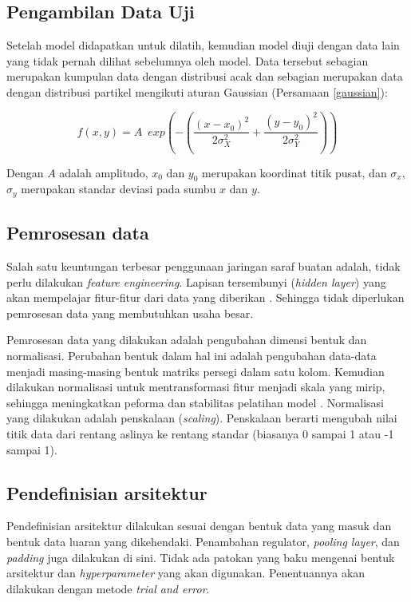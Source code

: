 \subsection{Pengambilan Data Uji}
Setelah model didapatkan untuk dilatih, kemudian model diuji dengan data lain
yang tidak pernah dilihat sebelumnya oleh model. Data tersebut sebagian merupakan
kumpulan data dengan distribusi acak dan sebagian merupakan data dengan distribusi
partikel mengikuti aturan Gaussian (Persamaan \eqref{gaussian}):

\begin{equation}
  \label{gaussian}f(x,y) = A \enspace exp \left(-\left(\frac{(x-x_{0})^{2}}{2
  \sigma^{2}_{X}}+ \frac{(y-y_{0})^{2}}{2 \sigma^{2}_{Y}}\right)\right)
\end{equation}

Dengan $A$ adalah amplitudo, $x_{0}$ dan $y_{0}$ merupakan koordinat titik pusat,
dan $\sigma_{x}$, $\sigma_{y}$ merupakan standar deviasi pada sumbu $x$ dan $y$.

\subsection{Pemrosesan data}
Salah satu keuntungan terbesar penggunaan jaringan saraf buatan adalah, tidak perlu
dilakukan \emph{feature engineering}. Lapisan tersembunyi (\emph{hidden layer})
yang akan mempelajar fitur-fitur dari data yang diberikan \citep{denny2015}.
Sehingga tidak diperlukan pemrosesan data yang membutuhkan usaha besar.

Pemrosesan data yang dilakukan adalah pengubahan dimensi bentuk dan normalisasi.
Perubahan bentuk dalam hal ini adalah pengubahan data-data menjadi masing-masing
bentuk matriks persegi dalam satu kolom. Kemudian dilakukan normalisasi untuk
mentransformasi fitur menjadi skala yang mirip, sehingga meningkatkan peforma dan
stabilitas pelatihan model \citep{google_2022}. Normalisasi yang dilakukan adalah
penskalaan (\emph{scaling}). Penskalaan berarti mengubah nilai titik data dari rentang
aslinya ke rentang standar (biasanya 0 sampai 1 atau -1 sampai 1).

\subsection{Pendefinisian arsitektur}

Pendefinisian arsitektur dilakukan sesuai dengan bentuk data yang masuk dan bentuk
data luaran yang dikehendaki. Penambahan regulator, \emph{pooling layer}, dan \emph{padding}
juga dilakukan di sini. Tidak ada patokan yang baku mengenai bentuk arsitektur dan
\emph{hyperparameter} yang akan digunakan. Penentuannya akan dilakukan dengan metode
\emph{trial and error}.

